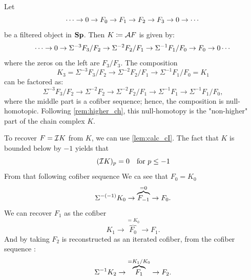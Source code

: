 \begin{exmp*}
    Let
    \begin{equation*}
        \dotsb \to \zr \to F_0 \to F_1 \to F_2 \to F_3 \to 0 \to\dotsb
    \end{equation*}
    be a filtered object in $\Sp$. Then $K \coloneqq \cA F$ is given by:
    \begin{equation*}
        \dotsb \to \zr \to \Sigma^{-3} F_3/F_2 \to \Sigma^{-2} F_2/F_1 \to \Sigma^{-1} F_1/F_0 \to F_0 \to \zr \dotsb
    \end{equation*}
    where the zeros on the left are $F_3 / F_3$. The composition 
    \begin{equation*}
        K_3 = \Sigma^{-3} F_3/F_2 \to \Sigma^{-2} F_2/F_1 \to \Sigma^{-1} F_1/F_0 = K_1
    \end{equation*}
    can be factored as:
    \begin{equation*}
        \Sigma^{-3} F_3/F_2 \to \Sigma^{-2} F_2 \to \Sigma^{-2} F_2/F_1 \to \Sigma^{-1} F_1 \to \Sigma^{-1} F_1/F_0,
    \end{equation*}
    where the middle part is a cofiber sequence; hence, the composition is null-homotopic. Following \cref{rem:higher_ch}, this null-homotopy is the "non-higher" part of the chain complex $K$.

    To recover $F = \cI K$ from $K$, we can use \cref{lem:calc_cI}. The fact that $K$ is bounded below by $-1$ yields that
    \begin{equation*}
        (\cI K)_p = 0\quad \text{for $p \leq -1$}
    \end{equation*}
    From that following cofiber sequence We ca see that $F_0 = K_0$ 
    \begin{equation*}
        \S^{-(-1)}K_0 \to \overbrace{F_{-1}}^{=0} \to F_0.
    \end{equation*}
    We can recover $F_1$ as the cofiber
    \begin{equation*}
        K_1 \to \overbrace{F_0}^{=K_0} \to F_1.
    \end{equation*}
    And by taking $F_2$ is reconstructed as an iterated cofiber, from the cofiber sequence :
    \begin{equation*}
        \S^{-1} K_2 \to \overbrace{F_1}^{=K_1/K_0} \to F_2.
    \end{equation*}
\end{exmp*}

